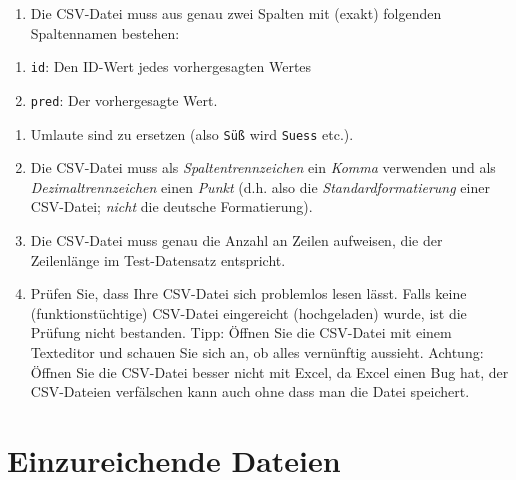 \documentclass[
]{book}
\providecommand{\tightlist}{%
  \setlength{\itemsep}{0pt}\setlength{\parskip}{0pt}}
\begin{document}
\begin{enumerate}
\def\labelenumi{\arabic{enumi}.}
\tightlist
\item
  Die CSV-Datei muss aus genau zwei Spalten mit (exakt) folgenden Spaltennamen bestehen:
\end{enumerate}

\begin{enumerate}
\def\labelenumi{\alph{enumi})}
\tightlist
\item
  \texttt{id}: Den ID-Wert jedes vorhergesagten Wertes
\item
  \texttt{pred}: Der vorhergesagte Wert.
\end{enumerate}

\begin{enumerate}
\def\labelenumi{\arabic{enumi}.}
\setcounter{enumi}{2}
\item
  Umlaute sind zu ersetzen (also \texttt{Süß} wird \texttt{Suess} etc.).
\item
  Die CSV-Datei muss als \emph{Spaltentrennzeichen} ein \emph{Komma} verwenden und als \emph{Dezimaltrennzeichen} einen \emph{Punkt} (d.h. also die \emph{Standardformatierung} einer CSV-Datei; \emph{nicht} die deutsche Formatierung).
\item
  Die CSV-Datei muss genau die Anzahl an Zeilen aufweisen, die der Zeilenlänge im Test-Datensatz entspricht.
\item
  Prüfen Sie, dass Ihre CSV-Datei sich problemlos lesen lässt.
  Falls keine (funktionstüchtige) CSV-Datei eingereicht (hochgeladen) wurde, ist die Prüfung nicht bestanden.
  Tipp: Öffnen Sie die CSV-Datei mit einem Texteditor und schauen Sie sich an, ob alles vernünftig aussieht.
  Achtung: Öffnen Sie die CSV-Datei besser nicht mit Excel, da Excel einen Bug hat,
  der CSV-Dateien verfälschen kann auch ohne dass man die Datei speichert.
\end{enumerate}

\hypertarget{einzureichende-dateien}{%
\section{Einzureichende Dateien}\label{einzureichende-dateien}}
\end{document}
